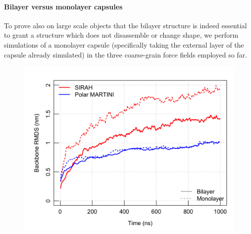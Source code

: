 \paragraph{Bilayer versus monolayer capsules}
To prove also on large scale objects that the bilayer structure is indeed essential to grant a structure which does not disassemble or change shape, we perform simulations of a monolayer capsule (specifically taking the external layer of the capsule already simulated) in the three coarse-grain force fields employed so far.
%
\begin{figure}[h!]
    \begin{minipage}[c]{0.5\textwidth}
        \includegraphics[width=\linewidth]{3results_capsule/pics/compare_MonoBi_rmsd.png} \\

\end{minipage}
\end{figure}
